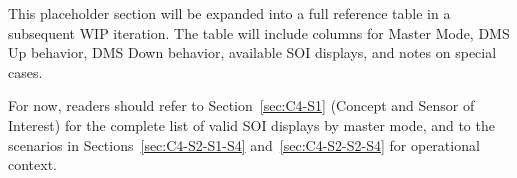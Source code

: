 \documentclass[11pt,a4paper]{article}
\begin{document}
This placeholder section will be expanded into a full reference table in a subsequent WIP iteration. The table will include columns for Master Mode, DMS Up behavior, DMS Down behavior, available SOI displays, and notes on special cases.

For now, readers should refer to Section~\ref{sec:C4-S1} (Concept and Sensor of Interest) for the complete list of valid SOI displays by master mode, and to the scenarios in Sections~\ref{sec:C4-S2-S1-S4} and~\ref{sec:C4-S2-S2-S4} for operational context.

\end{document}
